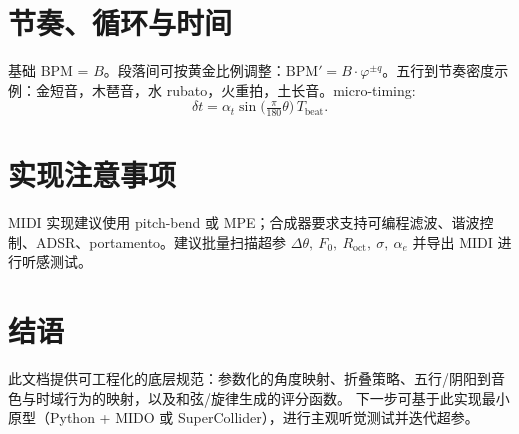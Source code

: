 \documentclass{article}
\begin{document}
\section{节奏、循环与时间}
基础 BPM = $B$。段落间可按黄金比例调整：$\mathrm{BPM}'=B\cdot\varphi^{\pm q}$。五行到节奏密度示例：金短音，木琶音，水 rubato，火重拍，土长音。micro-timing:
\[
\delta t = \alpha_t \sin\!\big( \tfrac{\pi}{180}\theta \big)\,T_{\mathrm{beat}}.
\]

\section{实现注意事项}
MIDI 实现建议使用 pitch-bend 或 MPE；合成器要求支持可编程滤波、谐波控制、ADSR、portamento。建议批量扫描超参 $\Delta\theta,\ F_0,\ R_{\mathrm{oct}},\ \sigma,\ \alpha_e$ 并导出 MIDI 进行听感测试。

\section{结语}
此文档提供可工程化的底层规范：参数化的角度映射、折叠策略、五行/阴阳到音色与时域行为的映射，以及和弦/旋律生成的评分函数。
下一步可基于此实现最小原型（Python + MIDO 或 SuperCollider），进行主观听觉测试并迭代超参。
\end{document}
